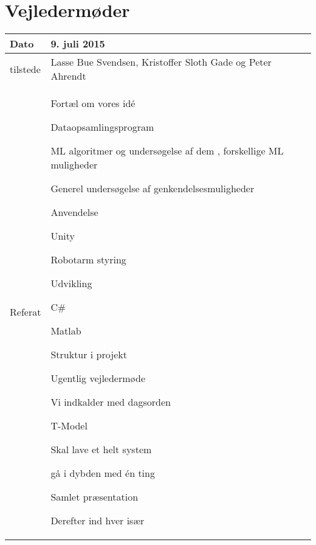 \chapter{Vejledermøder}
\label{bilag:vejl}
\vspace{-1cm}
\begin{center}
	\begin{tabular}{| l | p{10cm} |}
		\hline
		Dato		& 9. juli 2015\\ \hline
		tilstede 	& Lasse Bue Svendsen, Kristoffer Sloth Gade og Peter Ahrendt\\ \hline
		Referat		& \vspace{-5mm}\begin{myEnumerate}
			\item Fortæl om vores idé
			\begin{myItemize}				
				\item Dataopsamlingsprogram
				\item ML algoritmer og undersøgelse af dem , forskellige ML muligheder
				\item Generel undersøgelse af genkendelsesmuligheder
				\item Anvendelse
				\begin{myItemize}
					\item Unity
					\item Robotarm styring
				\end{myItemize}
			\end{myItemize}
			\item Udvikling
			\begin{myItemize}
				\item C\#
				\item Matlab
			\end{myItemize}
			\item Struktur i projekt
			\begin{myItemize}
				\item Ugentlig vejledermøde
				\item Vi indkalder med dagsorden
				\item T-Model
				\begin{myItemize}
					\item Skal lave et helt system
					\item gå i dybden med én ting
				\end{myItemize}
				\item Samlet præsentation
				\begin{myItemize}
					\item Derefter ind hver især

\end{myItemize}
\end{myItemize}
\end{myEnumerate}
\end{tabular}
\end{center}
